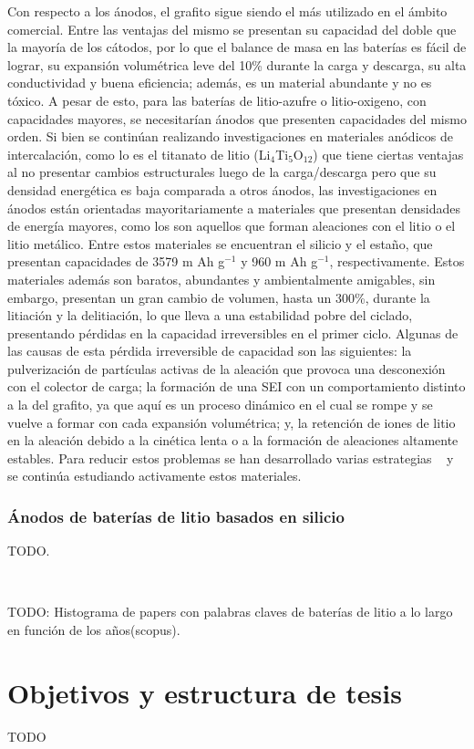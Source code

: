 Con respecto a los ánodos, el grafito sigue siendo el más utilizado en el ámbito
comercial. Entre las ventajas del mismo se presentan su capacidad del doble que 
la mayoría de los cátodos, por lo que el balance de masa en las baterías es fácil
de lograr, su expansión volumétrica leve del 10\% durante la carga y descarga, su
alta conductividad y buena eficiencia; además, es un material abundante y no es
tóxico. A pesar de esto, para las baterías de litio-azufre o litio-oxigeno, con
capacidades mayores, se necesitarían ánodos que presenten capacidades del mismo
orden. Si bien se continúan realizando investigaciones en materiales anódicos de 
intercalación, como lo es el titanato de litio (Li$_4$Ti$_5$O$_{12}$) que tiene
ciertas ventajas al no presentar cambios estructurales luego de la carga/descarga
pero que su densidad energética es baja comparada a otros ánodos, las 
investigaciones en ánodos están orientadas mayoritariamente a materiales que 
presentan densidades de energía mayores, como los son aquellos que forman 
aleaciones con el litio o el litio metálico. Entre estos materiales se encuentran
el silicio y el estaño, que presentan capacidades de 3579 m Ah g$^{-1}$ y
960 m Ah g$^{-1}$, respectivamente. Estos materiales además son baratos, 
abundantes y ambientalmente amigables, sin embargo, presentan un gran cambio de 
volumen, hasta un 300\%, durante la litiación y la delitiación, lo que lleva a
una estabilidad pobre del ciclado, presentando pérdidas en la capacidad 
irreversibles en el primer ciclo. Algunas de las causas de esta pérdida 
irreversible de capacidad son las siguientes: la pulverización de partículas 
activas de la aleación que provoca una desconexión con el colector de carga; la 
formación de una SEI con un comportamiento distinto a la del grafito, ya que aquí
es un proceso dinámico en el cual se rompe y se vuelve a formar con cada 
expansión volumétrica; y, la retención de iones de litio en la aleación debido a 
la cinética lenta o a la formación de aleaciones altamente estables. Para reducir
estos problemas se han desarrollado varias estrategias ~\cite{zhang2011} y se 
continúa estudiando activamente estos materiales.

\subsubsection{Ánodos de baterías de litio basados en silicio}

TODO.

\

TODO: Histograma de papers con palabras claves de baterías de litio a lo largo en
función de los años(scopus).

\section{Objetivos y estructura de tesis}

TODO

